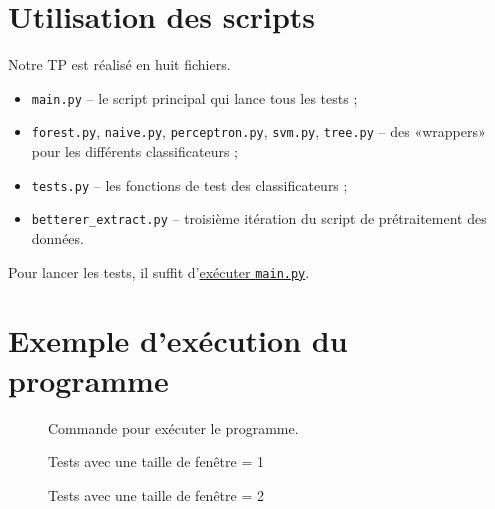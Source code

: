 \documentclass[11pt]{rapport-tp-ia}
\begin{document}
\renewcommand\thesection{\Alph{section}}
\renewcommand\thesubsection{\thesection.\Alph{subsection}}
\begin{appendices}
	\clearpage
		
		
	\section{Utilisation des scripts}
	Notre TP est réalisé en huit fichiers.
	\begin{itemize}
		\item \texttt{main.py} -- le script principal qui lance tous les tests ;
		\item  \texttt{forest.py}, \texttt{naive.py}, \texttt{perceptron.py}, \texttt{svm.py}, \texttt{tree.py} -- des «wrappers» pour les différents classificateurs ;
		\item \texttt{tests.py} -- les fonctions de test des classificateurs ;
		\item \texttt{betterer\_extract.py} -- troisième itération du script de prétraitement des données.
	\end{itemize}
		
	Pour lancer les tests, il suffit d'\hyperref[fig:exec]{exécuter \texttt{main.py}}.
	\section{Exemple d'exécution du programme}
	
	\begin{figure}[ht]
		\centering
		\caption{Commande pour exécuter le programme.\protect\footnotemark}
				
		\label{fig:exec}
	\end{figure}
	 
	
	 
	\begin{figure}[ht]
		\centering
		\caption{Tests avec une taille de fenêtre = 1}
				
		\label{fig:window1}
	\end{figure}
		   
	\begin{figure}[ht]
		\centering
		\caption{Tests avec une taille de fenêtre = 2}
				

\end{figure}
\end{appendices}
\end{document}
